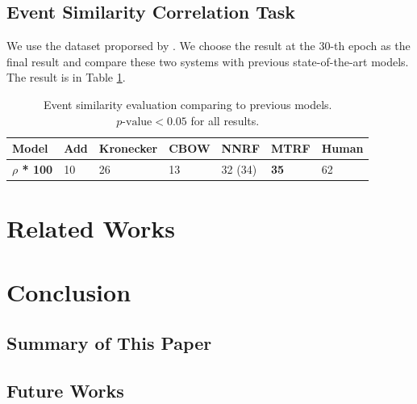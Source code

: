 \documentclass[a4paper]{article}
\begin{document}
\subsection{Event Similarity Correlation Task}  \label{sec:eventsim}
We use the dataset proporsed by \citet{grefenstette2015concrete}.
We choose the result at the $30$-th epoch as the final result and compare these two systems with previous state-of-the-art models. The result is in Table \ref{tab:GS_mtrf}. 


\begin{table}[t]
\centering
\begin{tabular}{l||lll|ll|l}
\textbf{Model}          &   Add &   Kronecker   &   CBOW    &   NNRF    &   MTRF        &   Human   \\ \hline
\textbf{$\rho$ * 100}   &   10  &   26          &   13      &   32 (34) &   \textbf{35} &   62      \\
\end{tabular}
\caption{\label{tab:GS_mtrf} Event similarity evaluation comparing to previous models. $p\text{-value} < 0.05$ for all results. }
\end{table}
% 
% 



\section{Related Works}



\section{Conclusion} 
\subsection{Summary of This Paper} 



\subsection{Future Works}



\newpage




\end{document}
